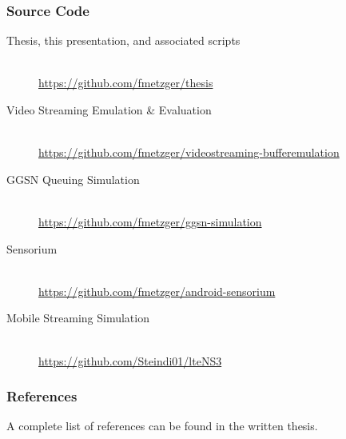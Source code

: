 \documentclass{beamer}
\begin{document}
\begin{frame}
	\frametitle{Source Code}

	\small\begin{description}
		\item[Thesis, this presentation, and associated scripts]\hfill \\
		\url{https://github.com/fmetzger/thesis}

		\item[Video Streaming Emulation \& Evaluation]\hfill \\
		\url{https://github.com/fmetzger/videostreaming-bufferemulation}

		\item[GGSN Queuing Simulation]\hfill \\
		\url{https://github.com/fmetzger/ggsn-simulation}

		\item[Sensorium]\hfill \\
		\url{https://github.com/fmetzger/android-sensorium}

		\item[Mobile Streaming Simulation]\hfill \\
		\url{https://github.com/Steindi01/lteNS3}
	\end{description}
\end{frame}

\begin{frame}[t,allowframebreaks]
	\frametitle{References}
	A complete list of references can be found in the written thesis.

	\printbibliography[notcategory=ownpub, heading=none, title=none]
\end{frame}











\begin{frame}
\end{frame}
\end{document}
